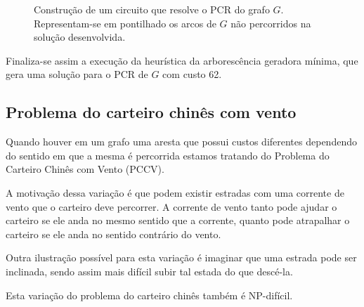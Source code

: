 \begin{enumerate}
\begin{figure}[H]
            \caption{Construção de um circuito que resolve o PCR do grafo $G$. Representam-se em pontilhado os arcos de $G$ não percorridos na solução desenvolvida.}
            \label{solucaoPCR}
        \end{figure}
	\end{enumerate}

    Finaliza-se assim a execução da heurística da arborescência geradora mínima, que gera uma solução para o PCR de $G$ com custo 62.

    \subsection{Problema do carteiro chinês com vento}

        Quando houver em um grafo uma aresta que possui custos diferentes dependendo do sentido em que a mesma é percorrida estamos tratando do Problema do Carteiro Chinês com Vento (PCCV).

        A motivação dessa variação é que podem existir estradas com uma corrente de vento que o carteiro deve percorrer. 
        A corrente de vento tanto pode ajudar o carteiro se ele anda no mesmo sentido que a corrente, quanto pode atrapalhar o carteiro se ele anda no sentido contrário do vento.

        Outra ilustração possível para esta variação é imaginar que uma estrada pode ser inclinada, sendo assim mais difícil subir tal estada do que descé-la.

        Esta variação do problema do carteiro chinês também é NP-difícil.

